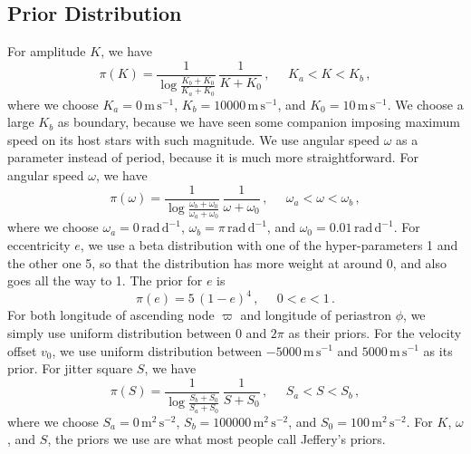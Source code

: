 \documentclass[letterpaper, preprint]{aastex}
\newcommand{\unit}[1]{\mathrm{#1}}
\begin{document}
\subsection{Prior Distribution}
For amplitude $K$, we have
\begin{equation}
\pi(K) = \frac{1}{\log{\frac{K_b+K_0}{K_a+K_0}}}\,\frac{1}{K+K_0}\, , \;\;\;\;\; K_a < K < K_b\, ,
\label{eq:prior-K}
\end{equation}
where we choose $K_a = 0\, \unit{m\,s^{-1}}$, $K_b = 10000\, \unit{m\,s^{-1}}$, and $K_0 = 10\, \unit{m\,s^{-1}}$. We choose a large $K_b$ as boundary, because we have seen some companion imposing maximum speed on its host stars with such magnitude. We use angular speed $\omega$ as a parameter instead of period, because it is much more straightforward. For angular speed $\omega$, we have
\begin{equation}
\pi(\omega) = \frac{1}{\log{\frac{\omega_b+\omega_0}{\omega_a+\omega_0}}}\,\frac{1}{\omega+\omega_0}\, , \;\;\;\;\; \omega_a <\omega< \omega_b\, ,
\end{equation}
where we choose $\omega_a = 0\, \unit{rad\,d^{-1}}$, $\omega_b = \pi\, \unit{rad\,d^{-1}}$, and $\omega_0 = 0.01\, \unit{rad\,d^{-1}}$. For eccentricity $e$, we use a beta distribution with one of the hyper-parameters 1 and the other one 5, so that the distribution has more weight at around 0, and also goes all the way to 1. The prior for $e$ is
\begin{equation}
\pi(e) = 5\,(1-e)^4\, , \;\;\;\;\; 0 < e < 1\,.
\label{eq:prior-e}
\end{equation}
For both longitude of ascending node $\varpi$ and longitude of periastron $\phi$, we simply use uniform distribution between $0$ and $2\pi$ as their priors. For the velocity offset $v_0$, we use uniform distribution between $-5000\, \unit{m\,s^{-1}}$ and $5000\, \unit{m\,s^{-1}}$ as its prior. For jitter square $S$, we have
\begin{equation}
\pi(S) = \frac{1}{\log{\frac{S_b+S_0}{S_a+S_0}}}\,\frac{1}{S+S_0}\, , \;\;\;\;\; S_a < S < S_b\, ,
\end{equation}
where we choose $S_a = 0\, \unit{m^2\,s^{-2}}$, $S_b = 100000\, \unit{m^2\,s^{-2}}$, and $S_0 = 100\, \unit{m^2\,s^{-2}}$. For $K$, $\omega$, and $S$, the priors we use are what most people call Jeffery's priors.
\end{document}
